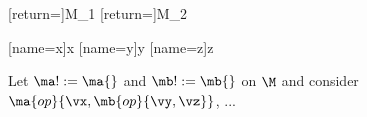 \documentclass{stex}
\begin{document}

[return={\monoid[universe=\M]}]{M_1}
[return={\monoid[universe=\M]}]{M_2}

[name=x]{x}
[name=y]{y}
[name=z]{z}

Let $\ma!:=\ma{}$ and $\mb!:=\mb{}$  on
$\M$ and consider $\ma{op}{\vx,\mb{op}{\vy,\vz}}$, ...
\end{document}
